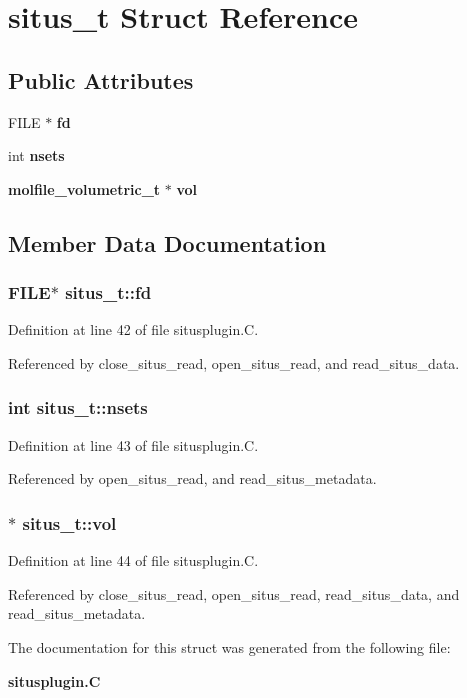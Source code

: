 \section{situs\_\-t  Struct Reference}
\label{structsitus__t}
\subsection*{Public Attributes}
\begin{CompactItemize}
\item 
FILE $\ast$ {\bf fd}
\item 
int {\bf nsets}
\item 
{\bf molfile\_\-volumetric\_\-t} $\ast$ {\bf vol}
\end{CompactItemize}


\subsection{Member Data Documentation}
\subsubsection{\setlength{\rightskip}{0pt plus 5cm}FILE$\ast$ situs\_\-t::fd}\label{structsitus__t_m0}




Definition at line 42 of file situsplugin.C.

Referenced by close\_\-situs\_\-read, open\_\-situs\_\-read, and read\_\-situs\_\-data.
\subsubsection{\setlength{\rightskip}{0pt plus 5cm}int situs\_\-t::nsets}\label{structsitus__t_m1}




Definition at line 43 of file situsplugin.C.

Referenced by open\_\-situs\_\-read, and read\_\-situs\_\-metadata.
\subsubsection{$\ast$ situs\_\-t::vol}\label{structsitus__t_m2}




Definition at line 44 of file situsplugin.C.

Referenced by close\_\-situs\_\-read, open\_\-situs\_\-read, read\_\-situs\_\-data, and read\_\-situs\_\-metadata.

The documentation for this struct was generated from the following file:\begin{CompactItemize}
\item 
{\bf situsplugin.C}\end{CompactItemize}
